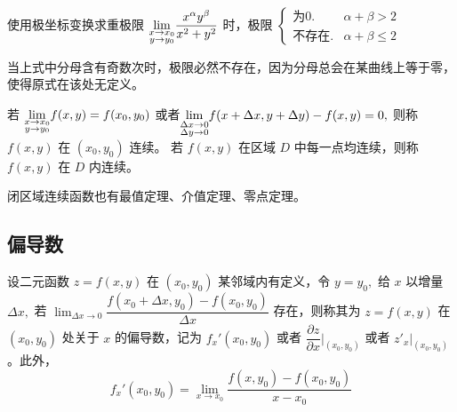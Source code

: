 使用极坐标变换求重极限 
$ {\displaystyle\lim_{\begin{subarray}{c}x\rightarrow x_0\\y\rightarrow y_0\end{subarray}}} 
\dfrac{x^\alpha y^\beta}{x^2+y^2} 
$ 时，极限
$ \begin{cases}
    \textrm{为}0.& \alpha+\beta > 2 \\
    \textrm{不存在}.& \alpha+\beta\leq 2
\end{cases} $ 

当上式中分母含有奇数次时，极限必然不存在，因为分母总会在某曲线上等于零，使得原式在该处无定义。
    

\begin{Def}[二元函数连续]

    若 $ {\displaystyle\lim_{\begin{subarray}{c}x\rightarrow x_0\\y\rightarrow y_0\end{subarray}}} 
    f(x,y) = f(x_0,y_0) $ 
    或者$ {\displaystyle\lim_{\begin{subarray}{c}\Delta x\rightarrow 0\\\Delta y\rightarrow 0\end{subarray}}} 
    f(x+\Delta x,y + \Delta y) - f(x,y) = 0, $ 
    则称 $ f(x,y) $ 在 $ (x_0,y_0) $ 连续。
    若 $ f(x,y) $ 在区域 $ D $ 中每一点均连续，则称 $ f(x,y) $ 在 $ D $ 内连续。
\end{Def}

闭区域连续函数也有最值定理、介值定理、零点定理。

\subsection{偏导数}

\begin{Def}[偏导数]

    设二元函数 $ z = f(x,y) $ 在 $ (x_0,y_0) $ 某邻域内有定义，令 $ y = y_0, $ 
    给 $ x $ 以增量 $ \Delta x, $ \nextline 若 $ {\displaystyle\lim_{\Delta x\rightarrow 0}}
    \dfrac{f(x_0+\Delta x,y_0)-f(x_0,y_0)}{\Delta x} $ 存在，则称其为 $ z = f(x,y) $ 
    在 $ (x_0,y_0) $ 处关于 $ x $ 的偏导数，\nextline 记为 $ f_x'(x_0,y_0) $ 
    或者 $ \dfrac{\partial z}{\partial x}\Big|_{(x_0,y_0)} $ 
    或者 $ z'_x\Big|_{(x_0,y_0)} $ 。此外，$$
        f_x'(x_0,y_0) = {\displaystyle\lim_{x\rightarrow x_0}}
        \dfrac{f(x,y_0)-f(x_0,y_0)}{x-x_0}
    $$ 
\end{Def}


